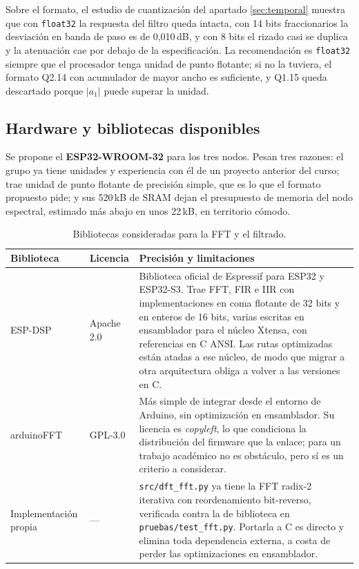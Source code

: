 Sobre el formato, el estudio de cuantización del apartado \ref{sec:temporal}
muestra que con \texttt{float32} la respuesta del filtro queda intacta, con 14
bits fraccionarios la desviación en banda de paso es de 0,010\,dB, y con 8 bits
el rizado casi se duplica y la atenuación cae por debajo de la especificación. La
recomendación es \texttt{float32} siempre que el procesador tenga unidad de punto
flotante; si no la tuviera, el formato Q2.14 con acumulador de mayor ancho es
suficiente, y Q1.15 queda descartado porque $|a_1|$ puede superar la unidad.

\subsection{Hardware y bibliotecas disponibles}

Se propone el \textbf{ESP32-WROOM-32} para los tres nodos. Pesan tres razones: el
grupo ya tiene unidades y experiencia con él de un proyecto anterior del curso;
trae unidad de punto flotante de precisión simple, que es lo que el formato
propuesto pide; y sus 520\,kB de SRAM dejan el presupuesto de memoria del nodo
espectral, estimado más abajo en unos 22\,kB, en territorio cómodo.

\begin{table}[H]
\centering\small
\caption{Bibliotecas consideradas para la FFT y el filtrado.}
\begin{tabular}{llp{6.4cm}}
\toprule
Biblioteca & Licencia & Precisión y limitaciones \\
\midrule
ESP-DSP \cite{espdsp} & Apache 2.0 & Biblioteca oficial de Espressif para ESP32 y ESP32-S3. Trae FFT, FIR e IIR con implementaciones en coma flotante de 32 bits y en enteros de 16 bits, varias escritas en ensamblador para el núcleo Xtensa, con referencias en C ANSI. Las rutas optimizadas están atadas a ese núcleo, de modo que migrar a otra arquitectura obliga a volver a las versiones en C. \\
\addlinespace
arduinoFFT \cite{arduinofft} & GPL-3.0 & Más simple de integrar desde el entorno de Arduino, sin optimización en ensamblador. Su licencia es \emph{copyleft}, lo que condiciona la distribución del firmware que la enlace; para un trabajo académico no es obstáculo, pero sí es un criterio a considerar. \\
\addlinespace
Implementación propia & --- & \texttt{src/dft\_fft.py} ya tiene la FFT radix-2 iterativa con reordenamiento bit-reverso, verificada contra la de biblioteca en \texttt{pruebas/test\_fft.py}. Portarla a C es directo y elimina toda dependencia externa, a costa de perder las optimizaciones en ensamblador. \\
\bottomrule
\end{tabular}
\end{table}

